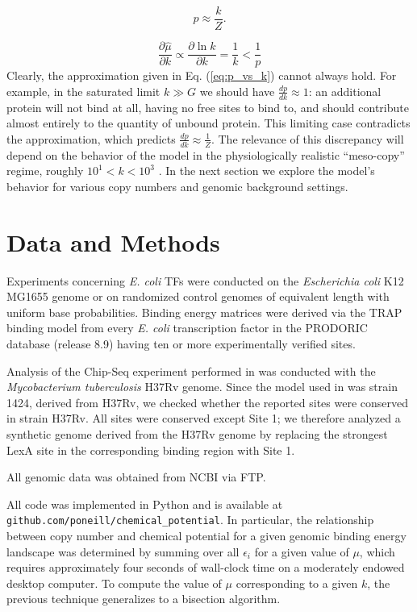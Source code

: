 \documentclass{article}
\begin{document}
\begin{equation}
  \label{eq:p_vs_k}
  p \approx \frac{k}{Z}.
\end{equation}

\begin{equation}
  \frac{\partial\hat\mu}{\partial k}\propto \frac{\partial\ln k}{\partial k} = \frac{1}{k} < \frac{1}{p}
\end{equation}
Clearly, the approximation given in Eq. (\ref{eq:p_vs_k}) cannot
always hold.  For example, in the saturated limit $k\gg G$ we should
have $\frac{dp}{dk}\approx 1$: an additional protein will not bind at
all, having no free sites to bind to, and should contribute almost
entirely to the quantity of unbound protein. This limiting case
contradicts the approximation, which predicts $\frac{dp}{dk}\approx
\frac{1}{Z}$.  The relevance of this discrepancy will depend on the
behavior of the model in the physiologically realistic ``meso-copy''
regime, roughly $10^1 < k < 10^3$ \cite{ishihama08}.  In the next section we explore the
model's behavior for various copy numbers and genomic background
settings.

\section{Data and Methods}
Experiments concerning \textit{E. coli} TFs were conducted on the
\textit{Escherichia coli} K12 MG1655 genome \cite{blattner97} or on
randomized control genomes of equivalent length with uniform base
probabilities.  Binding energy matrices were derived via the TRAP
binding model \cite{roider07} from every \textit{E. coli}
transcription factor in the PRODORIC database \cite{prodoric03}
(release 8.9) having ten or more experimentally verified sites.

Analysis of the Chip-Seq experiment performed in \cite{smollett12} was
conducted with the \textit{Mycobacterium tuberculosis} H37Rv genome.
Since the model used in \cite{smollett12} was strain 1424, derived
from H37Rv, we checked whether the reported sites were conserved in
strain H37Rv.  All sites were conserved except Site 1; we therefore
analyzed a synthetic genome derived from the H37Rv genome by replacing
the strongest LexA site in the corresponding binding region with Site
1.

All genomic data was obtained from NCBI via FTP.

All code was implemented in Python and is available at
\texttt{github.com/poneill/chemical\_potential}.  In particular, the
relationship between copy number and chemical potential for a given
genomic binding energy landscape was determined by summing
\cite{eq:s_fd} over all $\epsilon_i$ for a given value of $\mu$, which
requires approximately four seconds of wall-clock time on a moderately
endowed desktop computer.  To compute the value of $\mu$ corresponding
to a given $k$, the previous technique generalizes to a bisection
algorithm.
\end{document}
